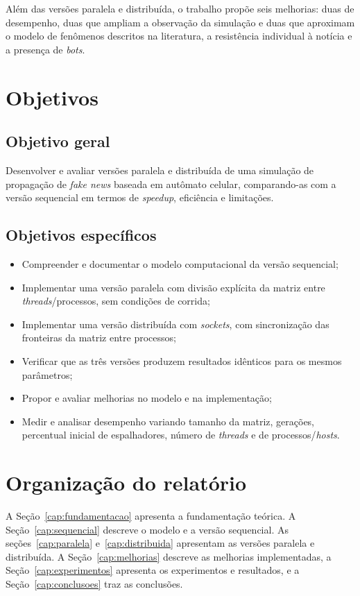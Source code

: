 Além das versões paralela e distribuída, o trabalho propõe seis melhorias: duas de desempenho, duas que ampliam a observação da simulação e duas que aproximam o modelo de fenômenos descritos na literatura, a resistência individual à notícia e a presença de \textit{bots}.

\section{Objetivos}

\subsection{Objetivo geral}

Desenvolver e avaliar versões paralela e distribuída de uma simulação de propagação de \textit{fake news} baseada em autômato celular, comparando-as com a versão sequencial em termos de \textit{speedup}, eficiência e limitações.

\subsection{Objetivos específicos}

\begin{itemize}
    \item Compreender e documentar o modelo computacional da versão sequencial;
    \item Implementar uma versão paralela com divisão explícita da matriz entre \textit{threads}/processos, sem condições de corrida;
    \item Implementar uma versão distribuída com \textit{sockets}, com sincronização das fronteiras da matriz entre processos;
    \item Verificar que as três versões produzem resultados idênticos para os mesmos parâmetros;
    \item Propor e avaliar melhorias no modelo e na implementação;
    \item Medir e analisar desempenho variando tamanho da matriz, gerações, percentual inicial de espalhadores, número de \textit{threads} e de processos/\textit{hosts}.
\end{itemize}

\section{Organização do relatório}

A Seção~\ref{cap:fundamentacao} apresenta a fundamentação teórica. A Seção~\ref{cap:sequencial} descreve o modelo e a versão sequencial. As seções~\ref{cap:paralela} e~\ref{cap:distribuida} apresentam as versões paralela e distribuída. A Seção~\ref{cap:melhorias} descreve as melhorias implementadas, a Seção~\ref{cap:experimentos} apresenta os experimentos e resultados, e a Seção~\ref{cap:conclusoes} traz as conclusões.
